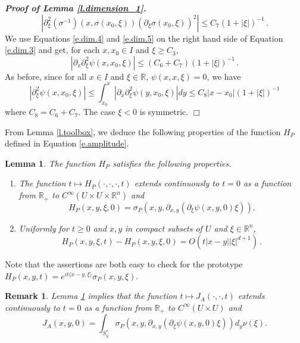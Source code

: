 \documentclass[10pt,twoside]{article}
\newcommand{\R}{\mathbb{R}}
\newenvironment{prf}[1][]
{\vskip 2mm  {\it \bf Proof#1. }}{$\Box$ \vskip 2mm}
\numberwithin{theorem}{section}
\newtheorem{lemma}[theorem]{Lemma}
\newtheorem{remark}{Remark}
\begin{document}
\begin{prf}[ of Lemma \ref{l.dimension_1}]
\begin{equation}\label{e.dim.5}
\left|\partial_\xi^2(\sigma^{-1})(x,\sigma(x_0,\xi))(\partial_\xi\sigma(x_0,\xi))^2\right|\leq C_7(1+|\xi|)^{-1}\, .
\end{equation}
We use Equations \eqref{e.dim.4} and \eqref{e.dim.5} on the right hand side of Equation \eqref{e.dim.3} and get, for each $x,x_0\in I$ and $\xi\geq C_3$,
\[
\left|\partial_x\partial_\xi^2\psi(x,x_0,\xi)\right|\leq (C_6+C_7)(1+|\xi|)^{-1}\, .
\]
As before, since for all $x\in I$ and $\xi\in\R$, $\psi(x,x,\xi)=0$, we have
\[
\left|\partial_\xi^2\psi(x,x_0,\xi)\right|\leq\int_{x_0}^x\left|\partial_x\partial_\xi^2\psi(y,x_0,\xi)\right|dy\leq C_8|x-x_0|(1+|\xi|)^{-1}
\]
where $C_8=C_6+C_7$. The case $\xi<0$ is symmetric.
\end{prf}

From Lemma \ref{l.toolbox}, we deduce the following properties of the function $H_P$ defined in Equation \eqref{e.amplitude}.
\begin{lemma}\label{l.jatz}
The function $H_P$ satisfies the following properties.
\begin{enumerate}
\item The function $t\mapsto H_P(\cdot,\cdot,\cdot,t)$ extends continuously to $t=0$ as a function from $\R_+$ to $C^\infty(U\times U\times\R^n)$ and
\[H_P(x,y,\xi,0)=\sigma_P\left(x,y,\partial_{x,y}(\partial_\xi\psi(x,y,0)\xi)\right).\]
\item Uniformly for $t\geq 0$ and $x,y$ in compact subsets of $U$ and $\xi\in \R^n$,
\[
H_P(x,y,\xi,t)-H_P(x,y,\xi,0)=O\left(t|x-y||\xi|^{d+1}\right)\, .
\]
\end{enumerate}
\end{lemma}
Note that the assertions are both easy to check for the prototype $H_P(x,y,t)=e^{it\langle x-y,\xi\rangle}\sigma_P(x,y,\xi)$.
\begin{remark}
Lemma \ref{l.jatz} implies that the function $t\mapsto J_A(\cdot,\cdot,t)$ extends continuously to $t=0$ as a function from $\R_+$ to $C^\infty(U\times U)$ and
\begin{equation}\label{e.j_is_y}
  J_A(x,y,0)=\int_{S^*_y}\sigma_P(x,y,\partial_{x,y}(\partial_\xi\psi(x,y,0)\xi))d_y\nu(\xi).
\end{equation}
\end{remark}
\end{document}
